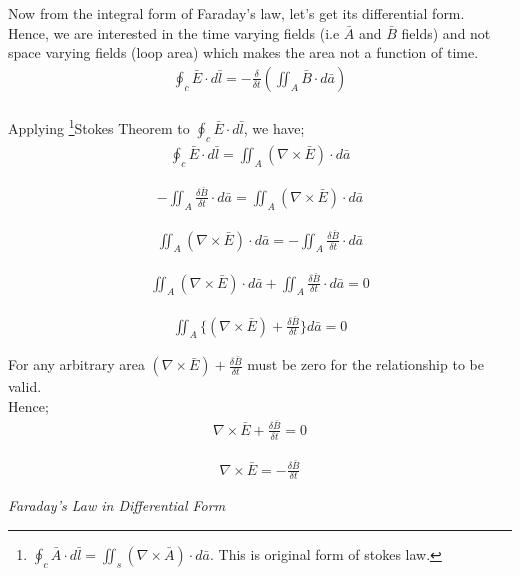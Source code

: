 	Now from the integral form of Faraday's law, let's get its differential form.\\
	Hence, we are interested in the time varying fields (i.e $\bar{A}$ and $\bar{B}$ fields) and not space varying fields (loop area) which makes the area not a function of time.\\
	
	
	\begin{align*}
	{\oint_c\bar{E}\cdot d\bar{l} = -\frac{\delta}{\delta t}(\iint_A\bar{B}\cdot d\bar{a})}
	\end{align*}
	\\		
	Applying \footnote[9]{$\oint_c\bar{A}\cdot d\bar{l} = \iint_s(\nabla \times \bar{A})\cdot d\bar{a}$. This is original form of stokes law.}Stokes Theorem to $\oint_c\bar{E}\cdot d\bar{l}$, we have; \\
	
	\begin{align*}
	\oint_c\bar{E}\cdot d\bar{l} = \iint_A(\nabla\times\bar{E})\cdot d\bar{a}
	\end{align*}
	
	\begin{align*}
	-\iint_A\frac{\delta \bar{B}}{\delta t}\cdot d\bar{a} = \iint_A(\nabla\times\bar{E})\cdot d\bar{a}
	\end{align*}
	
	\begin{align*}
	\iint_A(\nabla\times\bar{E})\cdot d\bar{a} = -\iint_A\frac{\delta \bar{B}}{\delta t}\cdot d\bar{a}
	\end{align*}
	
	\begin{align*}
	\iint_A(\nabla\times\bar{E})\cdot d\bar{a} + \iint_A\frac{\delta \bar{B}}{\delta t}\cdot d\bar{a} = 0
	\end{align*}
	
	\begin{align*}
	\iint_A\{(\nabla \times \bar{E})+ \frac{\delta \bar{B}}{\delta t}\} d\bar{a} = 0
	\end{align*} 
	
	For any arbitrary area $(\nabla \times \bar{E})+ \frac{\delta \bar{B}}{\delta t}$ must be zero for the relationship to be valid. \\
	
	Hence;
	\begin{align*}
	\nabla \times \bar{E}+ \frac{\delta \bar{B}}{\delta t} = 0
	\end{align*}
	
	\begin{align}
	\nabla \times \bar{E} = -\frac{\delta \bar{B}}{\delta t}
	\end{align}
	\begin{center}
		\emph{Faraday's Law in Differential Form}
	\end{center}
	
